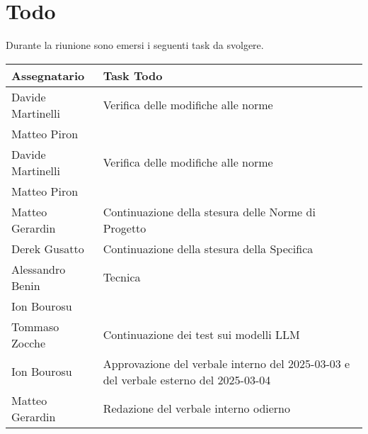 \section{Todo}
Durante la riunione sono emersi i seguenti task da svolgere.

\begin{center}
  \begin{tabular}{|L{5cm}|L{8cm}|}
    \hline
    \textbf{Assegnatario} & \textbf{Task Todo} \\ \hline
        Davide Martinelli & Verifica delle modifiche alle norme \\
        Matteo Piron & \\ \hline
        Davide Martinelli & Verifica delle modifiche alle norme \\ 
        Matteo Piron & \\ \hline
        Matteo Gerardin & Continuazione della stesura delle Norme di Progetto \\ \hline
        Derek Gusatto & Continuazione della stesura della Specifica \\ 
        Alessandro Benin & Tecnica \\
        Ion Bourosu & \\ \hline
        Tommaso Zocche & Continuazione dei test sui modelli LLM \\ \hline
        Ion Bourosu & Approvazione del verbale interno del 2025-03-03 e del verbale esterno del 2025-03-04 \\ \hline
        Matteo Gerardin & Redazione del verbale interno odierno \\ \hline
  \end{tabular}
\end{center}